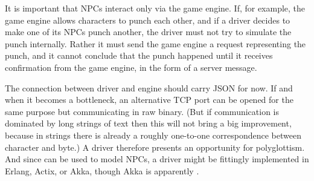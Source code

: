 It is important that NPCs interact only via the game engine.
If, for example, the game engine allows characters to punch each other,
and if a driver decides to make one of its NPCs punch another, the driver
must not try to simulate the punch internally.
Rather it must send the game engine a request representing the punch, and it
cannot conclude that the punch happened until it receives confirmation from the
game engine, in the form of a server message.

The connection between driver and engine should carry JSON for now.
If and when it becomes a bottleneck, an alternative TCP port can be opened for
the same purpose but communicating in raw binary.
(But if communication is dominated by long strings of text then this will not
bring a big improvement, because in strings there is already a roughly
one-to-one correspondence between character and byte.)
A driver therefore presents an opportunity for polyglottism.
And since
 can be used to
model NPCs, a driver might be fittingly implemented in Erlang, Actix,
or Akka, though Akka is apparently
.